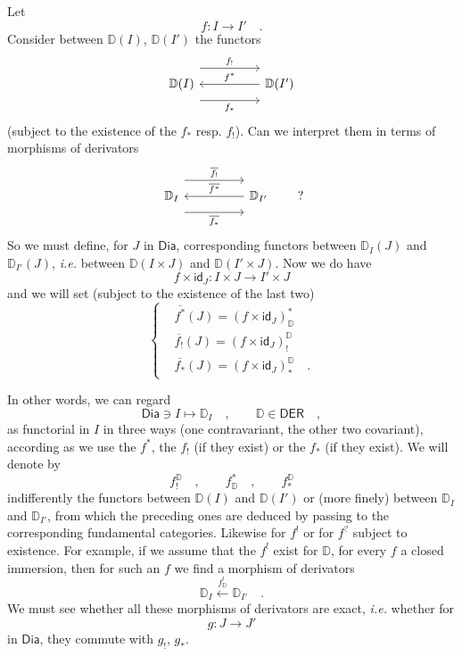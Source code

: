 \documentclass[11pt]{article}
\newcommand{\printedpage}[1]{\marginpar{\footnotesize p.~#1}}
\newcommand{\msp}[1]{\marginpar{\footnotesize [#1]}}
\newcommand{\D}{\mathbb{D}}
\newcommand{\Dia}{\mathsf{Dia}}
\newcommand{\DER}{\mathsf{DER}}
\newcommand{\id}{\mathsf{id}}
\begin{document}
\printedpage{15}

\msp{page 20}

Let
\[
f : I \longrightarrow I' \quad .
\]
Consider between $\D(I)$, $\D(I')$ the functors
\[
\begin{tikzcd}[column sep=huge]
\D(I) \arrow[r, shift left=3ex, "f_!"] \arrow[r, shift right=3ex, "f_*"'] & \D(I') \arrow[l, "f^*"']
\end{tikzcd}
\]
(subject to the existence of the $f_*$ resp. $f_!$). Can we interpret them in terms of morphisms of derivators
\[
\begin{tikzcd}[column sep=huge]
\D_I \arrow[r, shift left=3ex, "\overline{f_!}"] \arrow[r, shift right=3ex, "\overline{f_*}"'] & \D_{I'} \arrow[l, "\overline{f^*}"']
\end{tikzcd}
\qquad ?
\]
So we must define, for $J$ in $\Dia$, corresponding functors between $\D_I(J)$ and $\D_{I'}(J)$, \textit{i.e.} between $\D(I \times J)$ and $\D(I' \times J)$. Now we do have
\[
f \times \id_J : I \times J \longrightarrow I' \times J
\]
and we will set (subject to the existence of the last two)
\[
\left\{
\begin{aligned}
&\overline{f^*}(J) = (f \times \id_J)^*_{\D} \\[1ex]
&\overline{f_!}(J) = (f \times \id_J)^{\D}_! \\[1ex]
&\overline{f_*}(J) = (f \times \id_J)^{\D}_* \quad .
\end{aligned}
\right.
\]

\msp{page 21}

In other words, we can regard
\[
\Dia \ni I \longmapsto \D_I \quad , \qquad \D \in \DER \quad ,
\]
as functorial in $I$ in three ways (one contravariant, the other two covariant), according as we use the $f^*$, the $f_!$ (if they exist) or the $f_*$ (if they exist). We will denote by
\[
f^{\D}_! \quad , \qquad f^*_{\D} \quad , \qquad f^{\D}_*
\]
indifferently the functors between $\D(I)$ and $\D(I')$ or (more finely) between $\D_I$ and $\D_{I'}$, from which the preceding ones are deduced by passing to the corresponding fundamental categories. Likewise for $f^!$ or for $f^?$ subject to existence. For example, if we assume that the $f^!$ exist for $\D$, for every $f$ a closed immersion, then for such an $f$ we find a morphism of derivators
\[
\D_I \xleftarrow{f^!_{\D}} \D_{I'} \quad .
\]
We must see whether all these morphisms of derivators are exact, \textit{i.e.} whether for
\[
g : J \longrightarrow J'
\]
in $\Dia$, they commute with $g_!$, $g_*$.

\printedpage{16}
\end{document}
